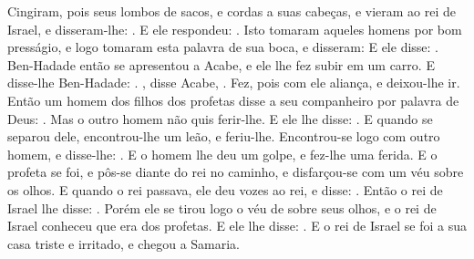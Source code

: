 {  Cingiram, pois seus lombos de sacos, e cordas a suas cabeças, e vieram ao rei de Israel, e disseram-lhe: . E ele respondeu: .
  Isto tomaram aqueles homens por bom presságio, e logo tomaram esta palavra de sua boca, e disseram:  E ele disse: . Ben-Hadade então se apresentou a Acabe, e ele lhe fez subir em um carro.
  E disse-lhe Ben-Hadade: . , disse Acabe, . Fez, pois com ele aliança, e deixou-lhe ir.
  Então um homem dos filhos dos profetas disse a seu companheiro por palavra de Deus: . Mas o outro homem não quis ferir-lhe.
  E ele lhe disse: . E quando se separou dele, encontrou-lhe um leão, e feriu-lhe.
  Encontrou-se logo com outro homem, e disse-lhe: . E o homem lhe deu um golpe, e fez-lhe uma ferida.
  E o profeta se foi, e pôs-se diante do rei no caminho, e disfarçou-se com um véu sobre os olhos.
  E quando o rei passava, ele deu vozes ao rei, e disse: . Então o rei de Israel lhe disse: .
  Porém ele se tirou logo o véu de sobre seus olhos, e o rei de Israel conheceu que era dos profetas.
  E ele lhe disse: .
  E o rei de Israel se foi a sua casa triste e irritado, e chegou a Samaria.
\par }

